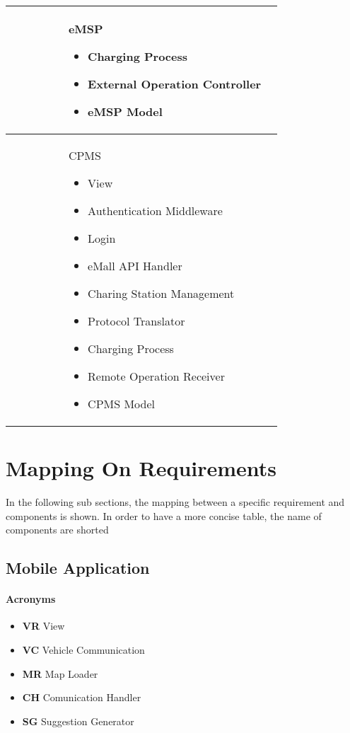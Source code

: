 \begin{longtable}{|p{0.20\linewidth}p{0.75\linewidth}|}
    \rowcolor{bluepoli!5}  & eMSP  \newline
    \begin{itemize}
        \item Charging Process
        \item External Operation Controller
        \item eMSP Model
    \end{itemize} \\
    \hline
    \rowcolor{bluepoli!5}  & CPMS  \newline
    \begin{itemize}
        \item View
        \item Authentication Middleware
        \item Login
        \item eMall API Handler
        \item Charing Station Management
        \item Protocol Translator
        \item Charging Process
        \item Remote Operation Receiver
        \item CPMS Model
    \end{itemize} \\
    \hline
\end{longtable}
\newpage
\section{Mapping On Requirements}
In the following sub sections, the mapping between a specific requirement and components is shown. In order to have a more concise table, the name of components are shorted
\subsection{Mobile Application}
\paragraph{Acronyms} 
\begin{itemize} [label={--}]
    \item \textbf{VR} View
    \item \textbf{VC} Vehicle Communication
    \item \textbf{MR} Map Loader
    \item \textbf{CH} Comunication Handler
    \item \textbf{SG} Suggestion Generator
\end{itemize}
